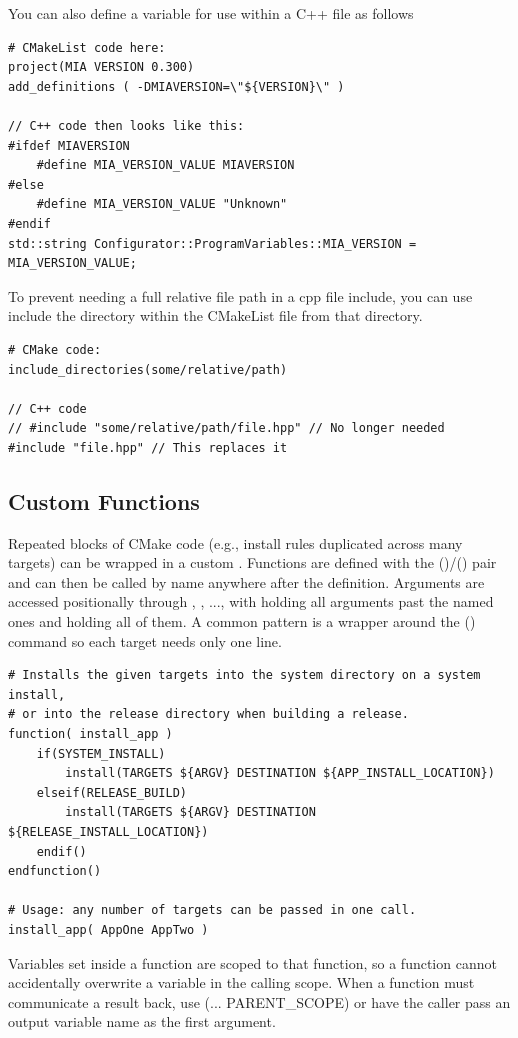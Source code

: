 You can also define a variable for use within a C++ file as follows
\begin{lstlisting}
# CMakeList code here:
project(MIA VERSION 0.300)
add_definitions ( -DMIAVERSION=\"${VERSION}\" )

// C++ code then looks like this:
#ifdef MIAVERSION
	#define MIA_VERSION_VALUE MIAVERSION
#else
	#define MIA_VERSION_VALUE "Unknown"
#endif
std::string Configurator::ProgramVariables::MIA_VERSION = MIA_VERSION_VALUE;
\end{lstlisting}

To prevent needing a full relative file path in a cpp file include, you can use include the directory within the CMakeList file from that directory.
\begin{lstlisting}
# CMake code:
include_directories(some/relative/path)

// C++ code
// #include "some/relative/path/file.hpp" // No longer needed
#include "file.hpp" // This replaces it
\end{lstlisting}


\subsection{Custom Functions}

Repeated blocks of CMake code (e.g., install rules duplicated across many targets) can be wrapped in a custom . Functions are defined with the ()/() pair and can then be called by name anywhere after the definition. Arguments are accessed positionally through , , ..., with  holding all arguments past the named ones and  holding all of them. A common pattern is a wrapper around the () command so each target needs only one line.
\begin{lstlisting}
# Installs the given targets into the system directory on a system install,
# or into the release directory when building a release.
function( install_app )
    if(SYSTEM_INSTALL)
        install(TARGETS ${ARGV} DESTINATION ${APP_INSTALL_LOCATION})
    elseif(RELEASE_BUILD)
        install(TARGETS ${ARGV} DESTINATION ${RELEASE_INSTALL_LOCATION})
    endif()
endfunction()

# Usage: any number of targets can be passed in one call.
install_app( AppOne AppTwo )
\end{lstlisting}

Variables set inside a function are scoped to that function, so a function cannot accidentally overwrite a variable in the calling scope. When a function must communicate a result back, use (... PARENT\_SCOPE) or have the caller pass an output variable name as the first argument.

